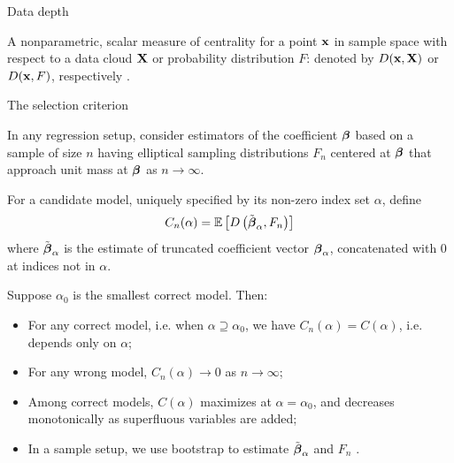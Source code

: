 \documentclass[landscape,a0paper,fontscale=0.3]{baposter} %
\newcommand{\compresslist}{ %
\setlength{\itemsep}{1pt}
\setlength{\parskip}{0pt}
\setlength{\parsep}{0pt}
}
\begin{document}
\begin{poster}
{{\large {\colbbf Data depth}}

A nonparametric, scalar measure of centrality for a point ${\bf{x}}$ in sample space with respect to a data cloud ${\mathbf{X}}$ or probability  distribution $F$: denoted by $D({\bf{x}}, {\mathbf{X}})$ or $D({\bf{x}}, F)$, respectively \citep{ZuoSerfling00c}.

\vspace{1em}
{\large {\colbbf The selection criterion}}

In any regression setup, consider estimators of the coefficient ${\boldsymbol{\beta}}$ based on a sample of size $n$ having elliptical sampling distributions $F_n$ centered at ${\boldsymbol{\beta}}$ that approach unit mass at ${\boldsymbol{\beta}}$ as $n \rightarrow \infty$.

\vspace{.3em}
For a candidate model, uniquely specified by its non-zero index set $\alpha$, define
\vspace{-.5em}
$$ C_n (\alpha) = \mathbb E \left[ D \left( \tilde {{\boldsymbol{\beta}}}_\alpha, F_n \right) \right] $$
where $\tilde {{\boldsymbol{\beta}}}_\alpha$ is the estimate of truncated coefficient vector ${\boldsymbol{\beta}}_\alpha$, concatenated with 0 at indices not in $\alpha$.

\vspace{.3em}
Suppose $\alpha_0$ is the smallest correct model. Then:

\vspace{-.5em}
\begin{itemize}[leftmargin=*]\compresslist
\item For any correct model, i.e. when $\alpha \supseteq \alpha_0$, we have $C_n(\alpha) = C(\alpha)$, i.e. depends only on $\alpha$;

\item For any wrong model, $C_n (\alpha) \rightarrow 0$ as $n \rightarrow \infty$;

\item Among correct models, $C(\alpha)$ maximizes at $\alpha=\alpha_0$, and decreases monotonically as superfluous variables are added;

\item In a sample setup, we use bootstrap to estimate $\tilde {{\boldsymbol{\beta}}}_\alpha$ and $F_n$ \citep{MajumdarMS}.
\end{itemize}
}


\end{poster}
\end{document}
